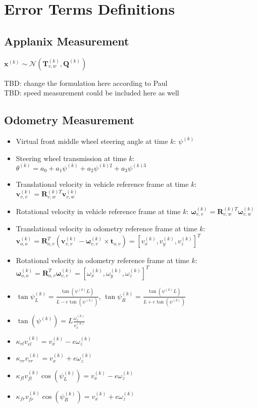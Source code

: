 \documentclass[12pt]{article}
\begin{document}
  \section{Error Terms Definitions}\label{sec:errors}
    \subsection{Applanix Measurement}
      $\mathbf{x}^{(k)}\sim\mathcal{N}(\mathbf{T}_{v,w}^{(k)},
        \mathbf{Q}^{(k)})$

      \noindent TBD: change the formulation here according to Paul\\
      \noindent TBD: speed measurement could be included here as well

    \subsection{Odometry Measurement}
      \begin{itemize}
        \item Virtual front middle wheel steering angle at time $k$:
          $\psi^{(k)}$
        \item Steering wheel transmission at time $k$:
          $\theta^{(k)} = a_0 + a_1\psi^{(k)} + a_2\psi^{(k)2} + a_3\psi^{(k)3}$
        \item Translational velocity in vehicle reference frame at time $k$:
          $\mathbf{v}_{v,v}^{(k)}=\mathbf{R}_{v,w}^{(k)T}\mathbf{v}_{v,w}^{(k)}$
        \item Rotational velocity in vehicle reference frame at time $k$:
          $\boldsymbol{\omega}_{v,v}^{(k)}=\mathbf{R}_{v,w}^{(k)T}
          \boldsymbol{\omega}_{v,w}^{(k)}$
        \item Translational velocity in odometry reference frame at time $k$:
          $\mathbf{v}_{o,o}^{(k)}=\mathbf{R}_{o,v}^T(\mathbf{v}_{v,v}^{(k)} -
          \boldsymbol{\omega}_{v,v}^{(k)}\times\mathbf{t}_{o,v})=
          [v_x^{(k)},v_y^{(k)},v_z^{(k)}]^T$
        \item Rotational velocity in odometry reference frame at time $k$:
          $\boldsymbol{\omega}_{o,o}^{(k)}=\mathbf{R}_{o,v}^T
          \boldsymbol{\omega}_{v,v}^{(k)}=
          [\omega_x^{(k)},\omega_y^{(k)},\omega_z^{(k)}]^T$
         \item $\tan\psi_L^{(k)}=
           \frac{\tan(\psi^{(k)} L)}{L - e\tan(\psi^{(k)})}$,
           $\tan\psi_R^{(k)}=\frac{\tan(\psi^{(k)} L)}{L + e\tan(\psi^{(k)})}$
         \item $\tan(\psi^{(k)})=L\frac{\omega_z^{(k)}}{v_x^{(k)}}$
         \item $\kappa_{rl}v_{rl}^{(k)}=v_x^{(k)}-e\omega_z^{(k)}$
         \item $\kappa_{rr}v_{rr}^{(k)}=v_x^{(k)}+e\omega_z^{(k)}$
         \item $\kappa_{fl}v_{fl}^{(k)}\cos(\psi_L^{(k)})=
           v_x^{(k)}-e\omega_z^{(k)}$
         \item $\kappa_{fr}v_{fr}^{(k)}\cos(\psi_R^{(k)})=
           v_x^{(k)}+e\omega_z^{(k)}$
      \end{itemize}
\end{document}
